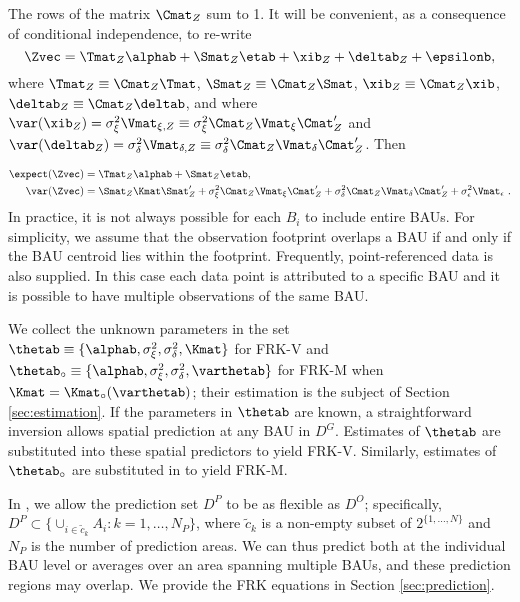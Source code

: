 

The rows of  the matrix $\Cmat_Z$ sum to 1. It will be convenient, as a consequence of conditional independence, to re-write
\begin{equation}\label{eq:Z_collapsed}
\Zvec = \Tmat_Z\alphab + \Smat_Z\etab + \xib_Z + \deltab_Z + \epsilonb,
\end{equation}
where $\Tmat_Z \equiv \Cmat_Z \Tmat$, $\Smat_Z \equiv \Cmat_Z \Smat$, $\xib_Z \equiv \Cmat_Z \xib$, $\deltab_Z \equiv \Cmat_Z \deltab$, and where $\var(\xib_Z) = \sigma^2_\xi\Vmat_{\xi,Z} \equiv \sigma^2_\xi\Cmat_Z\Vmat_{\xi}\Cmat_Z'$ and $\var(\deltab_Z) = \sigma^2_\delta\Vmat_{\delta,Z} \equiv \sigma^2_\delta\Cmat_Z\Vmat_\delta\Cmat_Z'$. Then

\begin{align*}
\expect(\Zvec) &=\Tmat_Z\alphab + \Smat_Z\etab,\\
\var(\Zvec) &= \Smat_Z\Kmat\Smat_Z' + \sigma^2_\xi\Cmat_Z\Vmat_{\xi}\Cmat_Z' +  \sigma^2_\delta\Cmat_Z\Vmat_\delta\Cmat_Z' + \sigma^2_\epsilon\Vmat_\epsilon~.
\end{align*}
In practice, it is not always possible for each $B_i$ to include entire BAUs. For simplicity, we assume that the observation footprint overlaps a BAU if and only if the BAU centroid lies within the footprint. Frequently, point-referenced data is also supplied. In this case each data point is attributed to a specific BAU and it is possible to have multiple observations of the same BAU.


We collect the unknown parameters in the set $\thetab \equiv \{\alphab, \sigma^2_\xi, \sigma^2_\delta, \Kmat\}$ for FRK-V and $\thetab_\circ \equiv \{\alphab, \sigma^2_\xi, \sigma^2_\delta, \varthetab\}$ for FRK-M when $\Kmat = \Kmat_\circ(\varthetab)$; their estimation is the subject of Section \ref{sec:estimation}. If the parameters in $\thetab$ are known, a straightforward inversion allows spatial prediction at any BAU in $D^G$. Estimates of $\thetab$ are substituted into these spatial predictors to yield FRK-V. Similarly, estimates of $\thetab_\circ$ are substituted in to yield FRK-M.

In , we allow the prediction set $D^P$ to be as flexible as $D^O$; specifically, $D^P \subset \{ \cup_{i \in \tilde{c}_k} A_i : k = 1,\dots,N_P \}$, where $\tilde{c}_k$ is a non-empty subset of $2^{\{1,\dots,N\}}$ and $N_P$ is the number of prediction areas. We can thus predict both at the individual BAU level or averages over an area spanning multiple BAUs, and these prediction regions may overlap. We provide the FRK equations in Section \ref{sec:prediction}.

